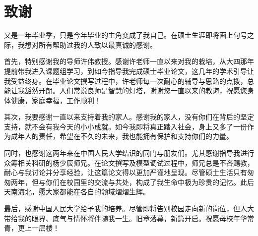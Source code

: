 \newpage
{}
\section*{致谢}
又是一年毕业季，只是今年毕业的主角变成了我自己。在硕士生涯即将画上句号之际，我想对所有帮助过我的人致以最真诚的感谢。

首先，特别感谢我的导师许伟教授。感谢许老师一直以来对我的栽培，从大四那年提前带我进入课题组学习，到如今指导我完成硕士毕业论文，这几年的学术引导让我受益终身。在毕业论文撰写过程中，许老师每一次耐心的辅导与思路的点拨，总能让我豁然开朗。人们常说良师是智慧的灯塔，谢谢您一直以来的教诲，祝愿您身体健康，家庭幸福，工作顺利！

其次，我要感谢一直以来支持着我的家人。感谢我的家人，没有你们在背后的坚定支持，就不会有我今天的小小成就。如今我即将真正踏入社会，身上又多了一份作为成年人的责任，希望在不久的未来，我也能拥有保护和支持你们的力量。

同时，也感谢这两年来在中国人民大学结识的同门与朋友们。尤其感谢指导我进行众筹相关科研的杨少辰师兄。在论文撰写及模型调试过程中，师兄总是不吝赐教，耐心与我讨论并分享经验，让这篇论文得以更加严谨地呈现。尽管硕士生活只有匆匆两年，但与你们在校园里的交流与共处，构成了我生命中极为珍贵的记忆。此后天南海北，愿大家都能在各自的领域熠熠生辉。

最后，感谢中国人民大学给予我的培养。尽管即将告别校园走向新的岗位，但人大带给我的眼界、底气与情怀将伴随我一生。旧章落幕，新篇开启。祝愿母校年华常青，更上一层楼！
